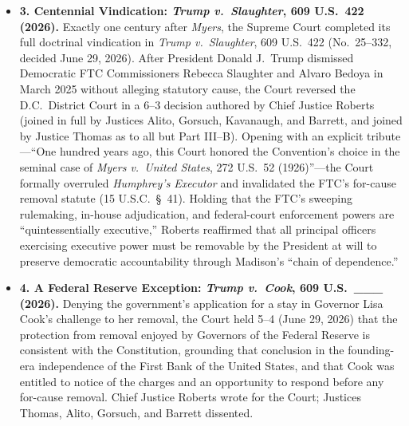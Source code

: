 \documentclass[12pt]{article}
\begin{document}
\begin{itemize}
\item \textbf{3. Centennial Vindication: \textit{Trump v.\ Slaughter}, 609 U.S.\ 422 (2026).}
Exactly one century after \textit{Myers}, the Supreme Court completed its full doctrinal vindication in \textit{Trump v.\ Slaughter}, 609 U.S.\ 422 (No.\ 25--332, decided June 29, 2026). After President Donald J.\ Trump dismissed Democratic FTC Commissioners Rebecca Slaughter and Alvaro Bedoya in March 2025 without alleging statutory cause, the Court reversed the D.C.\ District Court in a 6--3 decision authored by Chief Justice Roberts (joined in full by Justices Alito, Gorsuch, Kavanaugh, and Barrett, and joined by Justice Thomas as to all but Part III--B). Opening with an explicit tribute---``One hundred years ago, this Court honored the Convention's choice in the seminal case of \textit{Myers v.\ United States}, 272 U.S.\ 52 (1926)''---the Court formally overruled \textit{Humphrey's Executor} and invalidated the FTC's for-cause removal statute (15 U.S.C.\ \S~41). Holding that the FTC's sweeping rulemaking, in-house adjudication, and federal-court enforcement powers are ``quintessentially executive,'' Roberts reaffirmed that all principal officers exercising executive power must be removable by the President at will to preserve democratic accountability through Madison's ``chain of dependence.''

\item \textbf{4. A Federal Reserve Exception: \textit{Trump v.\ Cook}, 609 U.S.\ \_\_\_ (2026).} Denying the government's application for a stay in Governor Lisa Cook's challenge to her removal, the Court held 5--4 (June 29, 2026) that the protection from removal enjoyed by Governors of the Federal Reserve is consistent with the Constitution, grounding that conclusion in the founding-era independence of the First Bank of the United States, and that Cook was entitled to notice of the charges and an opportunity to respond before any for-cause removal. Chief Justice Roberts wrote for the Court; Justices Thomas, Alito, Gorsuch, and Barrett dissented.
\end{itemize}
\end{document}
